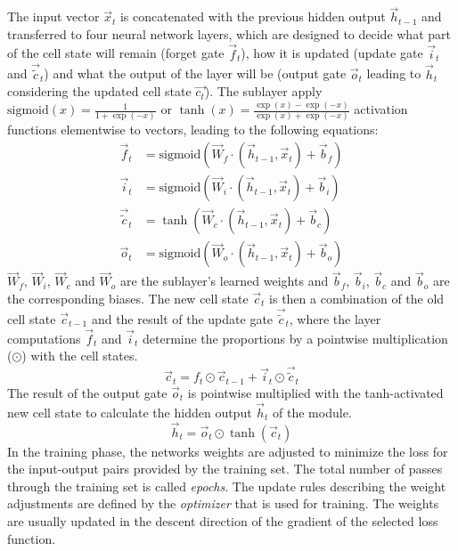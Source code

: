 The input vector $\vec{x}_t$ is concatenated with the previous hidden output $\vec{h}_{t-1}$ and transferred to four neural network layers, which are designed to decide what part of the cell state will remain (forget gate $\vec{f}_t$), how it is updated (update gate $\vec{i}_t$ and $\vec{\tilde{c}}_t$) and what the output of the layer will be (output gate $\vec{o}_t$ leading to $\vec{h}_t$ considering the updated cell state $\vec{c_t}$).
The sublayer apply $\text{sigmoid}(x) = \frac{1}{1+\exp({-x})}$ or $\tanh(x) = \frac{\exp({x}) - \exp({-x})}{\exp({x}) + \exp({-x})}$ activation functions elementwise to vectors, leading to the following equations:
\begin{align*}
\vec{f}_t & = \text{sigmoid}(\vec{W}_f \cdot (\vec{h}_{t-1}, \vec{x}_t) + \vec{b}_f) \\
\vec{i}_t & =  \text{sigmoid} (\vec{W}_i \cdot (\vec{h}_{t-1}, \vec{x}_t) + \vec{b}_i) \\
\vec{\tilde{c}}_t & = \tanh (\vec{W}_c \cdot (\vec{h}_{t-1}, \vec{x}_t) + \vec{b}_c) \\
\vec{o}_t & =  \text{sigmoid} (\vec{W}_o \cdot (\vec{h}_{t-1}, \vec{x}_t) + \vec{b}_o)
\end{align*}
$\vec{W}_f$, $\vec{W}_i$, $\vec{W}_c$ and $\vec{W}_o$ are the sublayer’s learned weights and $\vec{b}_f$, $\vec{b}_i$, $\vec{b}_c$ and $\vec{b}_o$ are the corresponding biases.
The new cell state $\vec{c}_t$ is then a combination of the old cell state $\vec{c}_{t-1}$ and the result of the update gate $\vec{\tilde{c}}_t$, where the layer computations $\vec{f}_t$ and $\vec{i}_t$ determine the proportions by a pointwise multiplication ($\odot$) with the cell states.
\begin{equation*}
	\vec{c}_t = f_t \odot \vec{c}_{t-1} + \vec{i}_t \odot \vec{\tilde{c}}_t
\end{equation*}
The result of the output gate $\vec{o}_t$ is pointwise multiplied with the tanh-activated new cell state to calculate the hidden output $\vec{h}_t$ of the module.
\begin{equation*}
	\vec{h}_t = \vec{o}_t \odot \tanh(\vec{c}_t )
\end{equation*}
In the training phase, the networks weights are adjusted to minimize the loss for the input-output pairs provided by the training set.
The total number of passes through the training set is called \textit{epochs}.
The update rules describing the weight adjustments are defined by the \textit{optimizer} that is used for training.
The weights are usually updated in the descent direction of the gradient of the selected loss function.

